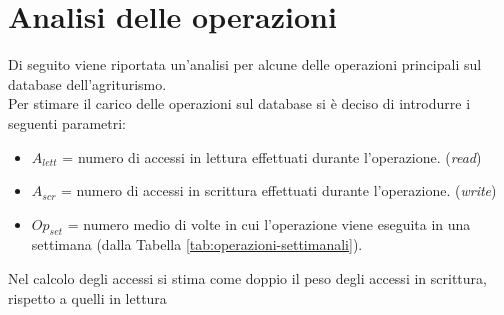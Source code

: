 \documentclass[a4paper,12pt]{report}
\begin{document}
\section{Analisi delle operazioni}
Di seguito viene riportata un'analisi per alcune delle operazioni principali sul database dell'agriturismo. \\
Per stimare il carico delle operazioni sul database si è deciso di introdurre i seguenti parametri:
\begin{itemize}
	\item $A_{lett}$ = numero di accessi in lettura effettuati durante l'operazione. (\textit{read})
	\item $A_{scr}$ = numero di accessi in scrittura effettuati durante l'operazione. (\textit{write})
	\item $Op_{set}$ = numero medio di volte in cui l'operazione viene eseguita in una settimana (dalla Tabella \ref{tab:operazioni-settimanali}).
\end{itemize}
Nel calcolo degli accessi si stima come doppio il peso degli accessi in scrittura, rispetto a quelli in lettura
\end{document}
